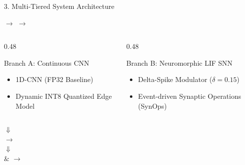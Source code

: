 \documentclass[aspectratio=169]{beamer}
\begin{document}
\begin{frame}{3. Multi-Tiered System Architecture}
\begin{center}
 $\longrightarrow$  $\longrightarrow$ 
\end{center}
\vspace{0.5em}
\begin{columns}
\begin{column}{0.48\textwidth}
\begin{block}{Branch A: Continuous CNN}
\begin{itemize}
    \item 1D-CNN (FP32 Baseline)
    \item Dynamic INT8 Quantized Edge Model
\end{itemize}
\end{block}
\end{column}
\begin{column}{0.48\textwidth}
\begin{block}{Branch B: Neuromorphic LIF SNN}
\begin{itemize}
    \item Delta-Spike Modulator ($\delta = 0.15$)
    \item Event-driven Synaptic Operations (SynOps)
\end{itemize}
\end{block}
\end{column}
\end{columns}
\vspace{0.5em}
\begin{center}
$\Downarrow$\\
 $\longrightarrow$ \\
$\Downarrow$\\
 \quad $\&$ \quad {} $\longrightarrow$ 
\end{center}
\end{frame}
\end{document}
